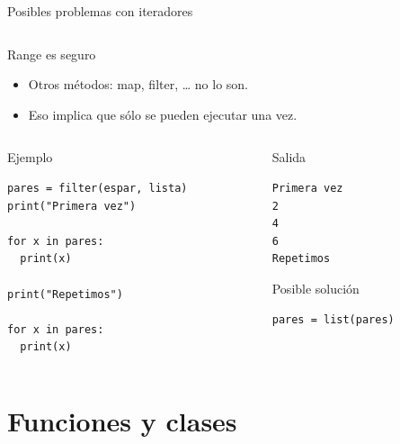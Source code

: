 \documentclass[bigger,unknownkeysallowed]{beamer}
\begin{document}
\begin{frame}[fragile,label={sec:org8f68024}]{Posibles problemas con iteradores}
 \begin{columns}
\begin{column}{1.0\columnwidth}
\begin{alertblock}{Range es seguro}
\begin{itemize}
\item Otros métodos: map, filter, \ldots{} no lo son.

\item Eso implica que sólo se pueden ejecutar una vez.
\end{itemize}
\end{alertblock}
\end{column}
\end{columns}

\begin{columns}[t]
\begin{column}{0.5\columnwidth}
\begin{exampleblock}{Ejemplo}
\begin{verbatim}
pares = filter(espar, lista)
print("Primera vez")

for x in pares:
  print(x)

print("Repetimos")

for x in pares:
  print(x)
\end{verbatim}
\end{exampleblock}
\end{column}
\begin{column}{0.5\columnwidth}
\begin{block}{Salida}
\scriptsize
\begin{verbatim}
Primera vez
2
4
6
Repetimos
\end{verbatim}
\end{block}

\begin{exampleblock}{Posible solución}
\begin{verbatim}
pares = list(pares)
\end{verbatim}
\end{exampleblock}
\end{column}
\end{columns}
\end{frame}

\section{Funciones y clases}
\label{sec:org6b306ca}
\end{document}
